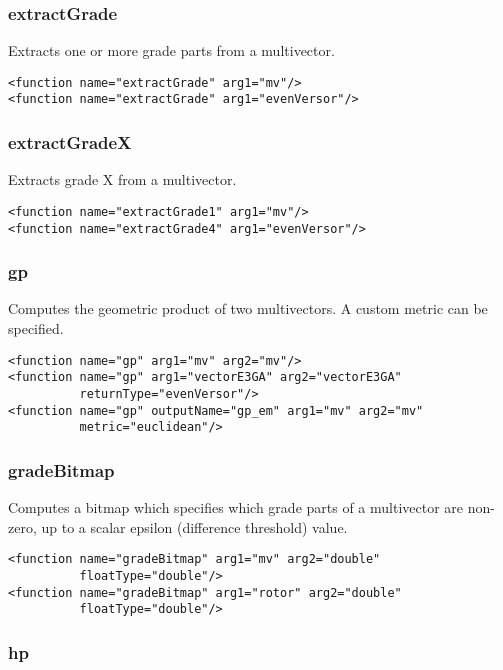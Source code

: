 \documentclass[10pt, a4paper]{article}
\begin{document}
\subsubsection*{extractGrade}

Extracts one or more grade parts from a multivector.
\begin{verbatim}
<function name="extractGrade" arg1="mv"/>
<function name="extractGrade" arg1="evenVersor"/>
\end{verbatim}

\subsubsection*{extractGradeX}

Extracts grade X from a multivector.
\begin{verbatim}
<function name="extractGrade1" arg1="mv"/>
<function name="extractGrade4" arg1="evenVersor"/>
\end{verbatim}

\subsubsection*{gp}

Computes the geometric product of two multivectors. A custom metric can be specified.
\begin{verbatim}
<function name="gp" arg1="mv" arg2="mv"/>
<function name="gp" arg1="vectorE3GA" arg2="vectorE3GA" 
          returnType="evenVersor"/>
<function name="gp" outputName="gp_em" arg1="mv" arg2="mv" 
          metric="euclidean"/>
\end{verbatim}

\subsubsection*{gradeBitmap}

Computes a bitmap which specifies which grade parts of a multivector are non-zero, up to a scalar epsilon (difference threshold) value.
\begin{verbatim}
<function name="gradeBitmap" arg1="mv" arg2="double" 
          floatType="double"/>
<function name="gradeBitmap" arg1="rotor" arg2="double"
          floatType="double"/>
\end{verbatim}

\subsubsection*{hp}
\end{document}
